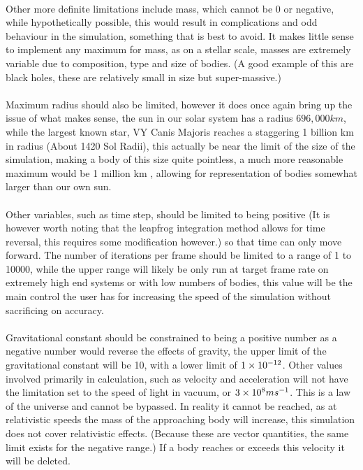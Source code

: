 \paragraph{}
Other more definite limitations include mass, which cannot be 0 or negative, while hypothetically possible, this would result in complications and odd behaviour in the simulation, something that is best to avoid. It makes little sense to implement any maximum for mass, as on a stellar scale, masses are extremely variable due to composition, type and size of bodies. (A good example of this are black holes, these are relatively small in size but super-massive.)

\paragraph{}
Maximum radius should also be limited, however it does once again bring up the issue of what makes sense, the sun in our solar system has a radius $696,000 km$, while the largest known star, VY Canis Majoris reaches a staggering 1 billion km in radius (About 1420 Sol Radii), this actually be near the limit of the size of the simulation, making a body of this size quite pointless, a much more reasonable maximum would be 1 million km , allowing for representation of bodies somewhat larger than our own sun.

\paragraph{}
Other variables, such as time step, should be limited to being positive (It is however worth noting that the leapfrog integration method allows for time reversal, this requires some modification however.) so that time can only move forward. The number of iterations per frame should be limited to a range of 1 to 10000, while the upper range will likely be only run at target frame rate on extremely high end systems or with low numbers of bodies, this value will be the main control the user has for increasing the speed of the simulation without sacrificing on accuracy.

\paragraph{}
Gravitational constant should be constrained to being a positive number as a negative number would reverse the effects of gravity, the upper limit of the gravitational constant will be 10, with a lower limit of $\num{1E-12}$.
Other values involved primarily in calculation, such as velocity and acceleration will not have the limitation set to the speed of light in vacuum, or $\num{3E8} ms^{-1}$. This is a law of the universe and cannot be bypassed. In reality it cannot be reached, as at relativistic speeds the mass of the approaching body will increase, this simulation does not cover relativistic effects. (Because these are vector quantities, the same limit exists for the negative range.) If a body reaches or exceeds this velocity it will be deleted.


